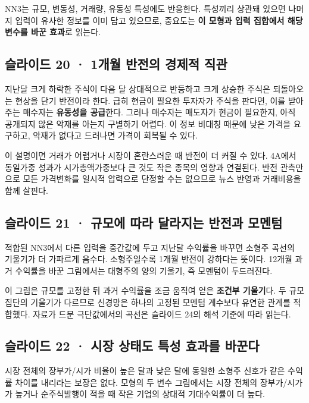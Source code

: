 \documentclass[11pt,a4paper]{article}
\begin{document}
NN3는 규모, 변동성, 거래량, 유동성 특성에도 반응한다. 특성끼리 상관돼 있으면 나머지 입력이 유사한 정보를 이미 담고 있으므로, 중요도는 \textbf{이 모형과 입력 집합에서 해당 변수를 바꾼 효과}로 읽는다.\par

\subsection{슬라이드 20 · 1개월 반전의 경제적 직관}
지난달 크게 하락한 주식이 다음 달 상대적으로 반등하고 크게 상승한 주식은 되돌아오는 현상을 단기 반전이라 한다. 급히 현금이 필요한 투자자가 주식을 판다면, 이를 받아 주는 매수자는 \textbf{유동성을 공급}한다. 그러나 매수자는 매도자가 현금이 필요한지, 아직 공개되지 않은 악재를 아는지 구별하기 어렵다. 이 정보 비대칭 때문에 낮은 가격을 요구하고, 악재가 없다고 드러나면 가격이 회복될 수 있다.\par

이 설명이면 거래가 어렵거나 시장이 혼란스러운 때 반전이 더 커질 수 있다. 4A에서 동일가중 성과가 시가총액가중보다 큰 것도 작은 종목의 영향과 연결된다. 반전 관측만으로 모든 가격변화를 일시적 압력으로 단정할 수는 없으므로 뉴스 반영과 거래비용을 함께 살핀다.\par

\subsection{슬라이드 21 · 규모에 따라 달라지는 반전과 모멘텀}
적합된 NN3에서 다른 입력을 중간값에 두고 지난달 수익률을 바꾸면 소형주 곡선의 기울기가 더 가파르게 음수다. 소형주일수록 1개월 반전이 강하다는 뜻이다. 12개월 과거 수익률을 바꾼 그림에서는 대형주의 양의 기울기, 즉 모멘텀이 두드러진다.\par

이 그림은 규모를 고정한 뒤 과거 수익률을 조금 움직여 얻은 \textbf{조건부 기울기}다. 두 규모 집단의 기울기가 다르므로 신경망은 하나의 고정된 모멘텀 계수보다 유연한 관계를 적합했다. 자료가 드문 극단값에서의 곡선은 슬라이드 24의 해석 기준에 따라 읽는다.\par

\subsection{슬라이드 22 · 시장 상태도 특성 효과를 바꾼다}
시장 전체의 장부가/시가 비율이 높은 달과 낮은 달에 동일한 소형주 신호가 같은 수익률 차이를 내리라는 보장은 없다. 모형의 두 변수 그림에서는 시장 전체의 장부가/시가가 높거나 순주식발행이 적을 때 작은 기업의 상대적 기대수익률이 더 높다.\par
\end{document}
